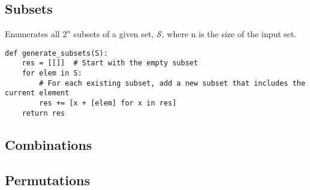 \subsection{Subsets}
\begin{algo}  Enumerates all $2^n$ subsets of a given set, $\mathcal{S}$, where n is the size of the input set.
\begin{lstlisting}
def generate_subsets(S):
    res = [[]]  # Start with the empty subset
    for elem in S:
        # For each existing subset, add a new subset that includes the current element
        res += [x + [elem] for x in res]
    return res
\end{lstlisting}
        
\end{algo}

\subsection{Combinations}
\begin{algo}
    
\end{algo}

\subsection{Permutations}
\begin{algo}
    
\end{algo}
